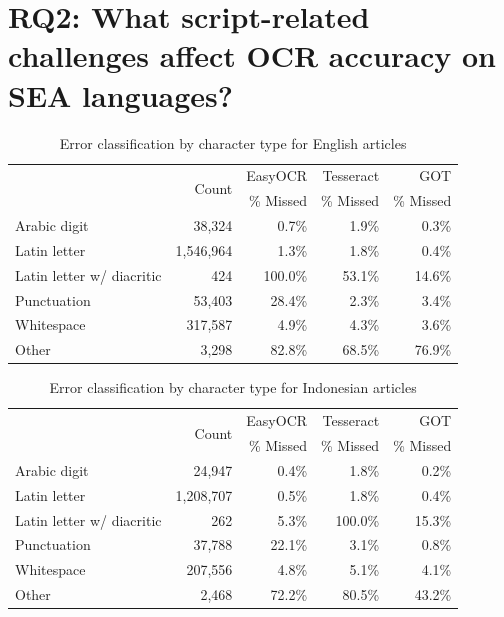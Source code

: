 \documentclass[12pt,oneside]{memoir}
\begin{document}
\section{RQ2: What script-related challenges affect OCR accuracy on SEA languages?}

\begin{table}[ht]
    \caption{Error classification by character type for English articles}
    \label{table:english-error-classification}
    \centering
    \begin{tabular}{lrrrr}
        \toprule
        & \multirow{2}{*}{Count} & EasyOCR & Tesseract & GOT\\
        & & \% Missed & \% Missed & \% Missed\\
        \midrule
        Arabic digit & 38,324 & 0.7\% & 1.9\% & 0.3\%\\
        Latin letter & 1,546,964 & 1.3\% & 1.8\% & 0.4\%\\
        Latin letter w/ diacritic & 424 & 100.0\% & 53.1\% & 14.6\%\\
        Punctuation & 53,403 & 28.4\% & 2.3\% & 3.4\%\\
        Whitespace & 317,587 & 4.9\% & 4.3\% & 3.6\%\\
        Other & 3,298 & 82.8\% & 68.5\% & 76.9\%\\
        \bottomrule
    \end{tabular}
\end{table}

\begin{table}[ht]
    \caption{Error classification by character type for Indonesian articles}
    \label{table:indonesian-error-classification}
    \centering
    \begin{tabular}{lrrrr}
        \toprule
        & \multirow{2}{*}{Count} & EasyOCR & Tesseract & GOT\\
        & & \% Missed & \% Missed & \% Missed\\
        \midrule
        Arabic digit & 24,947 & 0.4\% & 1.8\% & 0.2\%\\
        Latin letter & 1,208,707 & 0.5\% & 1.8\% & 0.4\%\\
        Latin letter w/ diacritic & 262 & 5.3\% & 100.0\% & 15.3\%\\
        Punctuation & 37,788 & 22.1\% & 3.1\% & 0.8\%\\
        Whitespace & 207,556 & 4.8\% & 5.1\% & 4.1\%\\
        Other & 2,468 & 72.2\% & 80.5\% & 43.2\%\\
        \bottomrule
    \end{tabular}
\end{table}
\end{document}
